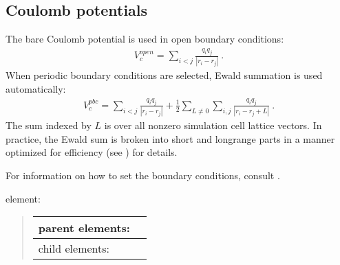 \documentclass[letterpaper,10pt,english]{sphinxmanual}
\begin{document}
\subsection{Coulomb potentials}
\label{\detokenize{hamiltonianobservable:coulomb-potentials}}
The bare Coulomb potential is used in open boundary conditions:
\begin{equation}\label{equation:hamiltonianobservable:eq29}
\begin{split}V_c^{open} = \sum_{i<j}\frac{q_iq_j}{\left|{r_i-r_j}\right|}\:.\end{split}
\end{equation}
When periodic boundary conditions are selected, Ewald summation is used automatically:
\begin{equation}\label{equation:hamiltonianobservable:eq30}
\begin{split}V_c^{pbc} = \sum_{i<j}\frac{q_iq_j}{\left|{r_i-r_j}\right|} + \frac{1}{2}\sum_{L\ne0}\sum_{i,j}\frac{q_iq_j}{\left|{r_i-r_j+L}\right|}\:.\end{split}
\end{equation}
The sum indexed by \(L\) is over all nonzero simulation cell lattice vectors.  In practice, the Ewald sum is broken into short\sphinxhyphen{} and long\sphinxhyphen{}range parts in a manner optimized for efficiency (see ) for details.

For information on how to set the boundary conditions, consult {\hyperref[\detokenize{simulationcell:simulationcell}]{}}.

 element:
\begin{quote}


\begin{savenotes}\sphinxattablestart
\centering
\begin{tabulary}{\linewidth}[t]{|T|T|}
\hline

parent elements:
&
\\
\hline
child elements:
&
\\
\hline
\end{tabulary}
\par
\sphinxattableend\end{savenotes}
\end{quote}
\end{document}

